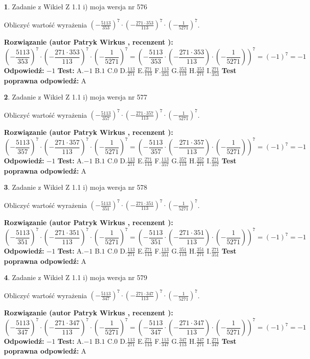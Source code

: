 \documentclass[12pt, a4paper]{article}
\theoremstyle{definition} %
\newtheorem{zad}{}
\newcommand{\zadStart}[1]{\begin{zad}#1\newline}
\newcommand{\zadStop}{\end{zad}}
\newcommand{\rozwStart}[2]{\noindent \textbf{Rozwiązanie (autor #1 , recenzent #2): }\newline}
\newcommand{\rozwStop}{\newline}
\newcommand{\odpStart}{\noindent \textbf{Odpowiedź:}\newline}
\newcommand{\odpStop}{\newline}
\newcommand{\testStart}{\noindent \textbf{Test:}\newline}
\newcommand{\testStop}{\newline}
\newcommand{\kluczStart}{\noindent \textbf{Test poprawna odpowiedź:}\newline}
\newcommand{\kluczStop}{\newline}
\begin{document}
\zadStart{Zadanie z Wikieł Z 1.1 i) moja wersja nr 576}

Obliczyć wartość wyrażenia $(-\frac{5113}{353})^{7} \cdot (-\frac{271 \cdot 353}{113})^{7} \cdot (-\frac{1}{5271})^{7}$.
\zadStop
\rozwStart{Patryk Wirkus}{}
$$(-\frac{5113}{353})^{7} \cdot (-\frac{271 \cdot 353}{113})^{7} \cdot (-\frac{1}{5271})^{7} = (-\frac{5113}{353} \cdot (-\frac{271 \cdot 353}{113}) \cdot (-\frac{1}{5271}))^{7} = (-1)^{7} = -1$$
\rozwStop
\odpStart
$-1$
\odpStop
\testStart
A.$-1$ B.$1$ C.$0$ D.$\frac{113}{271}$ E.$\frac{271}{113}$
F.$\frac{113}{353}$ G.$\frac{353}{113}$
H.$\frac{353}{271}$
I.$\frac{271}{353}$
\testStop
\kluczStart
A
\kluczStop



\zadStart{Zadanie z Wikieł Z 1.1 i) moja wersja nr 577}

Obliczyć wartość wyrażenia $(-\frac{5113}{357})^{7} \cdot (-\frac{271 \cdot 357}{113})^{7} \cdot (-\frac{1}{5271})^{7}$.
\zadStop
\rozwStart{Patryk Wirkus}{}
$$(-\frac{5113}{357})^{7} \cdot (-\frac{271 \cdot 357}{113})^{7} \cdot (-\frac{1}{5271})^{7} = (-\frac{5113}{357} \cdot (-\frac{271 \cdot 357}{113}) \cdot (-\frac{1}{5271}))^{7} = (-1)^{7} = -1$$
\rozwStop
\odpStart
$-1$
\odpStop
\testStart
A.$-1$ B.$1$ C.$0$ D.$\frac{113}{271}$ E.$\frac{271}{113}$
F.$\frac{113}{357}$ G.$\frac{357}{113}$
H.$\frac{357}{271}$
I.$\frac{271}{357}$
\testStop
\kluczStart
A
\kluczStop



\zadStart{Zadanie z Wikieł Z 1.1 i) moja wersja nr 578}

Obliczyć wartość wyrażenia $(-\frac{5113}{351})^{7} \cdot (-\frac{271 \cdot 351}{113})^{7} \cdot (-\frac{1}{5271})^{7}$.
\zadStop
\rozwStart{Patryk Wirkus}{}
$$(-\frac{5113}{351})^{7} \cdot (-\frac{271 \cdot 351}{113})^{7} \cdot (-\frac{1}{5271})^{7} = (-\frac{5113}{351} \cdot (-\frac{271 \cdot 351}{113}) \cdot (-\frac{1}{5271}))^{7} = (-1)^{7} = -1$$
\rozwStop
\odpStart
$-1$
\odpStop
\testStart
A.$-1$ B.$1$ C.$0$ D.$\frac{113}{271}$ E.$\frac{271}{113}$
F.$\frac{113}{351}$ G.$\frac{351}{113}$
H.$\frac{351}{271}$
I.$\frac{271}{351}$
\testStop
\kluczStart
A
\kluczStop



\zadStart{Zadanie z Wikieł Z 1.1 i) moja wersja nr 579}

Obliczyć wartość wyrażenia $(-\frac{5113}{347})^{7} \cdot (-\frac{271 \cdot 347}{113})^{7} \cdot (-\frac{1}{5271})^{7}$.
\zadStop
\rozwStart{Patryk Wirkus}{}
$$(-\frac{5113}{347})^{7} \cdot (-\frac{271 \cdot 347}{113})^{7} \cdot (-\frac{1}{5271})^{7} = (-\frac{5113}{347} \cdot (-\frac{271 \cdot 347}{113}) \cdot (-\frac{1}{5271}))^{7} = (-1)^{7} = -1$$
\rozwStop
\odpStart
$-1$
\odpStop
\testStart
A.$-1$ B.$1$ C.$0$ D.$\frac{113}{271}$ E.$\frac{271}{113}$
F.$\frac{113}{347}$ G.$\frac{347}{113}$
H.$\frac{347}{271}$
I.$\frac{271}{347}$
\testStop
\kluczStart
A
\kluczStop
\end{document}
